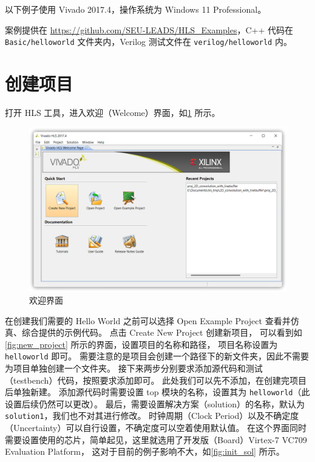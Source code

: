 \documentclass[English,Chinese,French,JP,TC,use boldface,simple name]{beaulivre}
\newenvironment{tip}[1][提示]{%
    \begin{tcolorbox}[breakable,
        enhanced,
        width = \textwidth,
        colback = paper, colbacktitle = paper,
        colframe = gray!50, boxrule=0.2mm,
        coltitle = black,
        fonttitle = \sffamily,
        attach boxed title to top left = {yshift=-\tcboxedtitleheight/2, xshift=.5cm},
        boxed title style = {boxrule=0pt, colframe=paper},
        before skip = 0.3cm,
        after skip = 0.3cm,
        top = 3mm,
        bottom = 3mm,
        title={\scshape\sffamily #1}]%
}{\end{tcolorbox}}
\begin{document}
    以下例子使用 Vivado 2017.4，操作系统为 Windows 11 Professional。

    \begin{tip}
      案例提供在 \url{https://github.com/SEU-LEADS/HLS_Examples}，C++ 代码在 \texttt{Basic/helloworld} 文件夹内，Verilog 测试文件在 \texttt{verilog/helloworld} 内。
      
    \end{tip}

  \section{创建项目}

    打开 HLS 工具，进入欢迎（Welcome）界面，如\cref{fig:welcome} 所示。
    \begin{figure}[htbp]
      \centering
      \includegraphics[width=.8\linewidth]{win/helloworld/welcome.png}
      \caption{欢迎界面}
      \label{fig:welcome}
    \end{figure}
    在创建我们需要的 Hello World 之前可以选择
    Open Example Project 查看并仿真、综合提供的示例代码。
    点击 Create New Project 创建新项目，
    可以看到如\cref{fig:new_project} 所示的界面，设置项目的名称和路径，
    项目名称设置为 \texttt{helloworld} 即可。
    需要注意的是项目会创建一个路径下的新文件夹，因此不需要为项目单独创建一个文件夹。
    接下来两步分别要求添加源代码和测试（testbench）代码，按照要求添加即可。
    此处我们可以先不添加，在创建完项目后单独新建。
    添加源代码时需要设置 top 模块的名称，设置其为 \texttt{helloworld}（此设置后续仍然可以更改）。
    最后，需要设置解决方案（solution）的名称，默认为 \texttt{solution1}，我们也不对其进行修改。
    时钟周期（Clock Period）以及不确定度（Uncertainty）可以自行设置，不确定度可以空着使用默认值。
    在这个界面同时需要设置使用的芯片，简单起见，这里就选用了开发版（Board）Virtex-7 VC709 Evaluation Platform，
    这对于目前的例子影响不大，如\cref{fig:init_sol} 所示。
\end{document}
